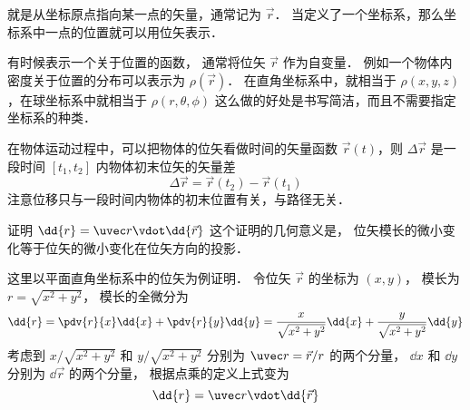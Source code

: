 
就是从坐标原点指向某一点的矢量，通常记为 $\vec r$． 当定义了一个坐标系，那么坐标系中一点的位置就可以用位矢表示．

有时候表示一个关于位置的函数， 通常将位矢 $\vec r$ 作为自变量． 例如一个物体内密度关于位置的分布可以表示为 $\rho(\vec r)$． 在直角坐标系中，就相当于 $\rho(x,y,z)$，在球坐标系中就相当于 $\rho(r,\theta,\phi)$ 这么做的好处是书写简洁，而且不需要指定坐标系的种类．

在物体运动过程中，可以把物体的位矢看做时间的矢量函数 $\vec r(t)$，则 $\Delta \vec r$ 是一段时间 $[t_1,t_2]$ 内物体初末位矢的矢量差
\begin{equation}
\Delta \vec r = \vec r(t_2) - \vec r(t_1)
\end{equation}
注意位移只与一段时间内物体的初末位置有关，与路径无关．

\begin{exam}{证明 $\dd{r} = \uvec r \vdot \dd{\vec r}$}\label{Disp_ex1}
这个证明的几何意义是， 位矢模长的微小变化等于位矢的微小变化在位矢方向的投影．

这里以平面直角坐标系中的位矢为例证明． 令位矢 $\vec r$ 的坐标为 $(x, y)$， 模长为 $r = \sqrt{x^2 + y^2}$，
模长的全微分为
\begin{equation}
\dd{r} = \pdv{r}{x} \dd{x} + \pdv{r}{y} \dd{y} = \frac{x}{\sqrt{x^2 + y^2}} \dd{x} + \frac{y}{\sqrt{x^2 + y^2}} \dd{y}
\end{equation}
考虑到 $x/\sqrt{x^2 + y^2}$ 和 $y/\sqrt{x^2 + y^2}$ 分别为 $\uvec r = \vec r/r$ 的两个分量， $\dd{x}$ 和 $\dd{y}$ 分别为 $\dd{\vec r}$ 的两个分量， 根据点乘的定义上式变为
\begin{equation}
\dd{r} = \uvec r \vdot \dd{\vec r}
\end{equation}
\end{exam}

